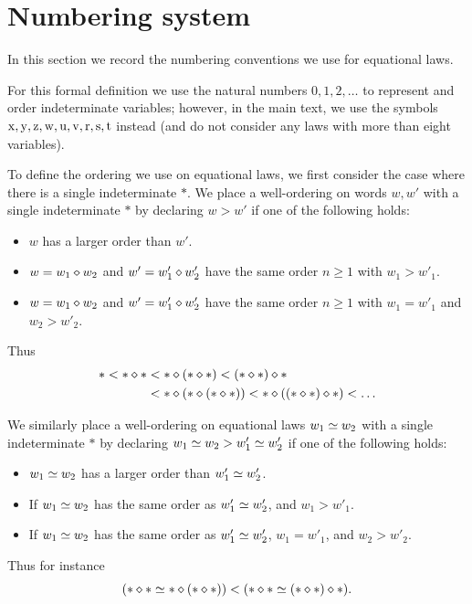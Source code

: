 \section{Numbering system}\label{numbering-app}

In this section we record the numbering conventions we use for equational laws.

For this formal definition we use the natural numbers $0,1,2,\dots$ to represent and order indeterminate variables; however, in the main text, we use the symbols $\mathrm{x},\mathrm{y},\mathrm{z},\mathrm{w},\mathrm{u},\mathrm{v},\mathrm{r},\mathrm{s},\mathrm{t}$ instead (and do not consider any laws with more than eight variables).

To define the ordering we use on equational laws, we first consider the case where there is a single indeterminate $\ast$.
We place a well-ordering on words $w,w'$ with a single indeterminate $\ast$ by declaring $w > w'$ if one of the following holds:
\begin{itemize}
    \item $w$ has a larger order than $w'$.
    \item $w = w_1 \diamond w_2$ and $w' = w'_1 \diamond w'_2$ have the same order $n \geq 1$ with $w_1 > w'_1$.
    \item $w = w_1 \diamond w_2$ and $w' = w'_1 \diamond w'_2$ have the same order $n \geq 1$ with $w_1 = w'_1$ and $w_2 > w'_2$.
\end{itemize}
Thus
\begin{align*}
  \ast < \ast \diamond \ast &< \ast \diamond (\ast \diamond \ast) < (\ast \diamond \ast) \diamond \ast \\
  & < \ast \diamond (\ast \diamond (\ast \diamond \ast)) < \ast \diamond ((\ast \diamond \ast) \diamond \ast) < \dots
\end{align*}

We similarly place a well-ordering on equational laws $w_1 \simeq w_2$ with a single indeterminate $\ast$ by declaring $w_1 \simeq w_2 > w'_1 \simeq w'_2$ if one of the following holds:
\begin{itemize}
\item  $w_1 \simeq w_2$ has a larger order than $w'_1 \simeq w'_2$.
\item If $w_1 \simeq w_2$ has the same order as $w'_1 \simeq w'_2$, and $w_1 > w'_1$.
\item If $w_1 \simeq w_2$ has the same order as $w'_1 \simeq w'_2$, $w_1 = w'_1$, and $w_2 > w'_2$.
\end{itemize}
Thus for instance
$$ (\ast \diamond \ast \simeq \ast \diamond (\ast \diamond \ast)) < (\ast \diamond \ast \simeq (\ast \diamond \ast) \diamond \ast).$$

